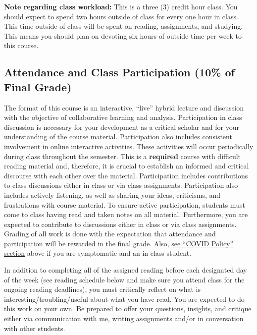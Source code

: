 \documentclass[11pt,]{article}
\begin{document}
\textbf{Note regarding class workload:} This is a three (3) credit hour
class. You should expect to spend two hours outside of class for every
one hour in class. This time outside of class will be spent on reading,
assignments, and studying. This means you should plan on devoting six
hours of outside time per week to this course.

\hypertarget{attendance-and-class-participation-10-of-final-grade}{%
\subsection{Attendance and Class Participation (10\% of Final
Grade)}\label{attendance-and-class-participation-10-of-final-grade}}

The format of this course is an interactive, ``live'' hybrid lecture and
discussion with the objective of collaborative learning and analysis.
Participation in class discussion is necessary for your development as a
critical scholar and for your understanding of the course material.
Participation also includes consistent involvement in online interactive
activities. These activities will occur periodically during class
throughout the semester. This is a \textbf{required} course with
difficult reading material and, therefore, it is crucial to establish an
informed and critical discourse with each other over the material.
Participation includes contributions to class discussions either in
class or via class assignments. Participation also includes actively
listening, as well as sharing your ideas, criticisms, and frustrations
with course material. To ensure active participation, students must come
to class having read and taken notes on all material. Furthermore, you
are expected to contribute to discussions either in class or via class
assignments. Grading of all work is done with the expectation that
attendance and participation will be rewarded in the final grade. Also,
\protect\hyperlink{covid_policy}{see ``COVID Policy'' section} above if
you are symptomatic and an in-class student.

In addition to completing all of the assigned reading before each
designated day of the week (see reading schedule below and make sure you
attend class for the ongoing reading deadlines), you must critically
reflect on what is interesting/troubling/useful about what you have
read. You are expected to do this work on your own. Be prepared to offer
your questions, insights, and critique either via communication with me,
writing assignments and/or in conversation with other students.
\end{document}
